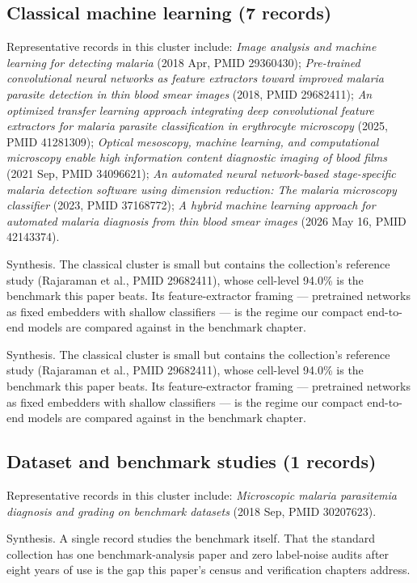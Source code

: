 \subsection*{Classical machine learning (7 records)}
Representative records in this cluster include: \emph{Image analysis and machine learning for detecting malaria} (2018 Apr, PMID 29360430); \emph{Pre-trained convolutional neural networks as feature extractors toward improved malaria parasite detection in thin blood smear images} (2018, PMID 29682411); \emph{An optimized transfer learning approach integrating deep convolutional feature extractors for malaria parasite classification in erythrocyte microscopy} (2025, PMID 41281309); \emph{Optical mesoscopy, machine learning, and computational microscopy enable high information content diagnostic imaging of blood films} (2021 Sep, PMID 34096621); \emph{An automated neural network-based stage-specific malaria detection software using dimension reduction: The malaria microscopy classifier} (2023, PMID 37168772); \emph{A hybrid machine learning approach for automated malaria diagnosis from thin blood smear images} (2026 May 16, PMID 42143374).\par

Synthesis. The classical cluster is small but contains the collection's reference study (Rajaraman et al., PMID 29682411), whose cell-level 94.0\% is the benchmark this paper beats. Its feature-extractor framing --- pretrained networks as fixed embedders with shallow classifiers --- is the regime our compact end-to-end models are compared against in the benchmark chapter.


Synthesis. The classical cluster is small but contains the collection's reference study (Rajaraman et al., PMID 29682411), whose cell-level 94.0\% is the benchmark this paper beats. Its feature-extractor framing --- pretrained networks as fixed embedders with shallow classifiers --- is the regime our compact end-to-end models are compared against in the benchmark chapter.


\subsection*{Dataset and benchmark studies (1 records)}
Representative records in this cluster include: \emph{Microscopic malaria parasitemia diagnosis and grading on benchmark datasets} (2018 Sep, PMID 30207623).\par

Synthesis. A single record studies the benchmark itself. That the standard collection has one benchmark-analysis paper and zero label-noise audits after eight years of use is the gap this paper's census and verification chapters address.


